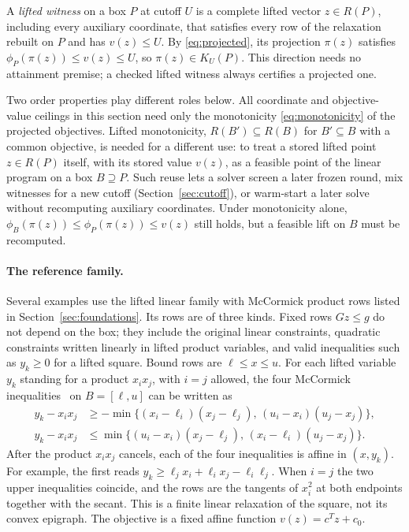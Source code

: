 A \emph{lifted witness} on a box $P$ at cutoff $U$ is a complete lifted
vector $z\in R(P)$, including every auxiliary coordinate, that satisfies
every row of the relaxation rebuilt on $P$ and has $v(z)\le U$. By
\eqref{eq:projected}, its projection $\pi(z)$ satisfies
$\phi_P(\pi(z))\le v(z)\le U$, so $\pi(z)\in K_U(P)$. This direction needs
no attainment premise; a checked lifted witness always certifies a
projected one.

Two order properties play different roles below. All coordinate and
objective-value ceilings in this section need only the monotonicity
\eqref{eq:monotonicity} of the projected objectives. Lifted monotonicity,
$R(B')\subseteq R(B)$ for $B'\subseteq B$ with a common objective, is
needed for a different use: to treat a stored lifted point $z\in R(P)$
itself, with its stored value $v(z)$, as a feasible point of the linear
program on a box $B\supseteq P$. Such reuse lets a solver screen a later
frozen round, mix witnesses for a new cutoff (Section~\ref{sec:cutoff}),
or warm-start a later solve without recomputing auxiliary coordinates.
Under monotonicity alone, $\phi_B(\pi(z))\le\phi_P(\pi(z))\le v(z)$ still
holds, but a feasible lift on $B$ must be recomputed.

\paragraph{The reference family.}
Several examples use the lifted linear family with McCormick product rows
listed in Section~\ref{sec:foundations}. Its rows are of three kinds. Fixed rows
$Gz\le g$ do not depend on the box; they include the original linear
constraints, quadratic constraints written linearly in lifted product
variables, and valid inequalities such as $y_k\ge0$ for a lifted square.
Bound rows are $\ell\le x\le u$. For each lifted variable $y_k$ standing
for a product $x_ix_j$, with $i=j$ allowed, the four McCormick
inequalities~\cite{mccormick1976-computability-of-global-solutions-to} on
$B=[\ell,u]$ can be written as
\begin{equation}\label{eq:mccormick-gap}
\begin{aligned}
 y_k-x_ix_j&\ge-\min\{(x_i-\ell_i)(x_j-\ell_j),\,(u_i-x_i)(u_j-x_j)\},\\
 y_k-x_ix_j&\le\min\{(u_i-x_i)(x_j-\ell_j),\,(x_i-\ell_i)(u_j-x_j)\}.
\end{aligned}
\end{equation}
After the product $x_ix_j$ cancels, each of the four inequalities is
affine in $(x,y_k)$. For example, the first reads
$y_k\ge\ell_jx_i+\ell_ix_j-\ell_i\ell_j$. When $i=j$ the two upper
inequalities coincide, and the rows are the tangents of $x_i^2$ at both
endpoints together with the secant. This is a finite linear relaxation of
the square, not its convex epigraph. The objective is a fixed affine
function $v(z)=c^Tz+c_0$.

